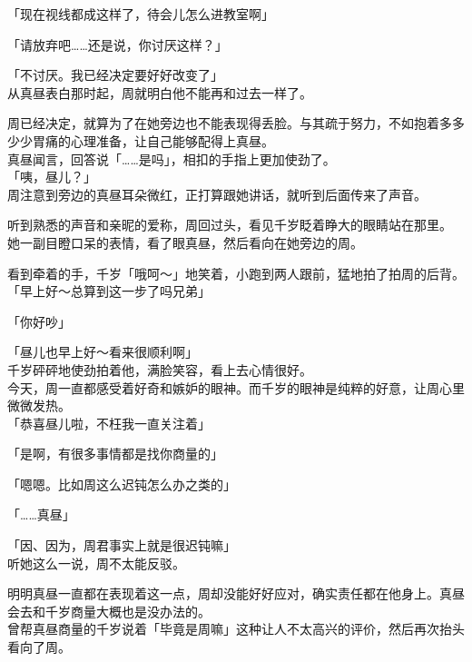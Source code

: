「现在视线都成这样了，待会儿怎么进教室啊」

「请放弃吧……还是说，你讨厌这样？」

「不讨厌。我已经决定要好好改变了」\\

从真昼表白那时起，周就明白他不能再和过去一样了。

周已经决定，就算为了在她旁边也不能表现得丢脸。与其疏于努力，不如抱着多多少少胃痛的心理准备，让自己能够配得上真昼。\\

真昼闻言，回答说「……是吗」，相扣的手指上更加使劲了。\\

「咦，昼儿？」\\

周注意到旁边的真昼耳朵微红，正打算跟她讲话，就听到后面传来了声音。

听到熟悉的声音和亲昵的爱称，周回过头，看见千岁眨着睁大的眼睛站在那里。\\

她一副目瞪口呆的表情，看了眼真昼，然后看向在她旁边的周。

看到牵着的手，千岁「哦呵～」地笑着，小跑到两人跟前，猛地拍了拍周的后背。\\

「早上好～总算到这一步了吗兄弟」

「你好吵」

「昼儿也早上好～看来很顺利啊」\\

千岁砰砰地使劲拍着他，满脸笑容，看上去心情很好。\\

今天，周一直都感受着好奇和嫉妒的眼神。而千岁的眼神是纯粹的好意，让周心里微微发热。\\

「恭喜昼儿啦，不枉我一直关注着」

「是啊，有很多事情都是找你商量的」

「嗯嗯。比如周这么迟钝怎么办之类的」

「……真昼」

「因、因为，周君事实上就是很迟钝嘛」\\

听她这么一说，周不太能反驳。

明明真昼一直都在表现着这一点，周却没能好好应对，确实责任都在他身上。真昼会去和千岁商量大概也是没办法的。\\

曾帮真昼商量的千岁说着「毕竟是周嘛」这种让人不太高兴的评价，然后再次抬头看向了周。\\

